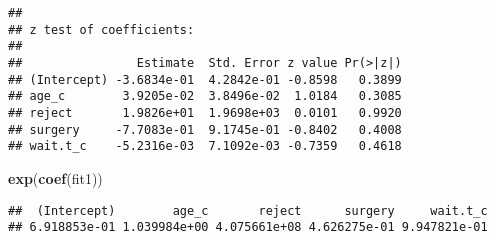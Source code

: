 \documentclass[]{article}
\newenvironment{Shaded}{\begin{snugshade}}{\end{snugshade}}
\newcommand{\DataTypeTok}[1]{\textcolor[rgb]{0.13,0.29,0.53}{#1}}
\newcommand{\DecValTok}[1]{\textcolor[rgb]{0.00,0.00,0.81}{#1}}
\newcommand{\KeywordTok}[1]{\textcolor[rgb]{0.13,0.29,0.53}{\textbf{#1}}}
\newcommand{\NormalTok}[1]{#1}
\newcommand{\OperatorTok}[1]{\textcolor[rgb]{0.81,0.36,0.00}{\textbf{#1}}}
\newcommand{\StringTok}[1]{\textcolor[rgb]{0.31,0.60,0.02}{#1}}
\begin{document}
\begin{Shaded}
\end{Shaded}

\begin{verbatim}
## 
## z test of coefficients:
## 
##                Estimate  Std. Error z value Pr(>|z|)
## (Intercept) -3.6834e-01  4.2842e-01 -0.8598   0.3899
## age_c        3.9205e-02  3.8496e-02  1.0184   0.3085
## reject       1.9826e+01  1.9698e+03  0.0101   0.9920
## surgery     -7.7083e-01  9.1745e-01 -0.8402   0.4008
## wait.t_c    -5.2316e-03  7.1092e-03 -0.7359   0.4618
\end{verbatim}

\begin{Shaded}
\begin{Highlighting}[]
\KeywordTok{exp}\NormalTok{(}\KeywordTok{coef}\NormalTok{(fit1))}
\end{Highlighting}
\end{Shaded}

\begin{verbatim}
##  (Intercept)        age_c       reject      surgery     wait.t_c 
## 6.918853e-01 1.039984e+00 4.075661e+08 4.626275e-01 9.947821e-01
\end{verbatim}
\end{document}
